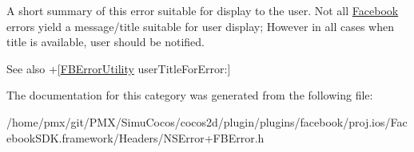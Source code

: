 A short summary of this error suitable for display to the user. Not all \hyperlink{interfaceFacebook}{Facebook} errors yield a message/title suitable for user display; However in all cases when title is available, user should be notified.

\begin{DoxySeeAlso}{See also}
+\mbox{[}\hyperlink{interfaceFBErrorUtility}{F\+B\+Error\+Utility} user\+Title\+For\+Error\+:\mbox{]} 
\end{DoxySeeAlso}


The documentation for this category was generated from the following file\+:\begin{DoxyCompactItemize}
\item 
/home/pmx/git/\+P\+M\+X/\+Simu\+Cocos/cocos2d/plugin/plugins/facebook/proj.\+ios/\+Facebook\+S\+D\+K.\+framework/\+Headers/N\+S\+Error+\+F\+B\+Error.\+h\end{DoxyCompactItemize}
